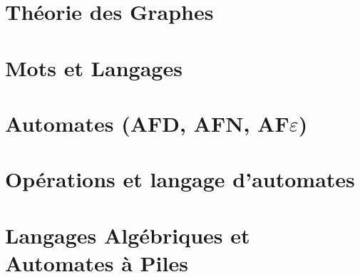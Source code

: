 



\chapter{Théorie des Graphes}


\chapter{Mots et Langages}


\chapter{Automates (AFD, AFN, AF$\varepsilon$)}


\chapter{Opérations et langage d'automates}


\chapter{Langages Algébriques et Automates à Piles}


